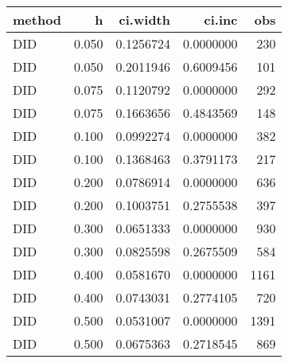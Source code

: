 \documentclass[
]{article}
\begin{document}
\begin{longtable}[]{@{}lrrrr@{}}
\toprule
method & h & ci.width & ci.inc & obs \\
\midrule
\endhead
DID & 0.050 & 0.1256724 & 0.0000000 & 230 \\
DID & 0.050 & 0.2011946 & 0.6009456 & 101 \\
DID & 0.075 & 0.1120792 & 0.0000000 & 292 \\
DID & 0.075 & 0.1663656 & 0.4843569 & 148 \\
DID & 0.100 & 0.0992274 & 0.0000000 & 382 \\
DID & 0.100 & 0.1368463 & 0.3791173 & 217 \\
DID & 0.200 & 0.0786914 & 0.0000000 & 636 \\
DID & 0.200 & 0.1003751 & 0.2755538 & 397 \\
DID & 0.300 & 0.0651333 & 0.0000000 & 930 \\
DID & 0.300 & 0.0825598 & 0.2675509 & 584 \\
DID & 0.400 & 0.0581670 & 0.0000000 & 1161 \\
DID & 0.400 & 0.0743031 & 0.2774105 & 720 \\
DID & 0.500 & 0.0531007 & 0.0000000 & 1391 \\
DID & 0.500 & 0.0675363 & 0.2718545 & 869 \\
\bottomrule
\end{longtable}
\end{document}

